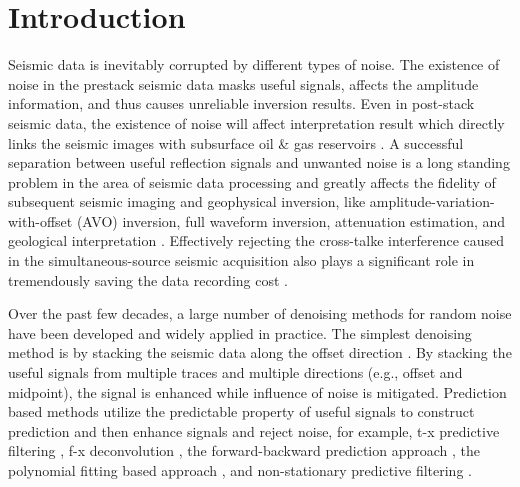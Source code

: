 \section{Introduction}
Seismic data is inevitably corrupted by different types of noise. The existence of noise in the prestack seismic data masks useful signals, affects the amplitude information, and thus causes unreliable inversion results. Even in post-stack seismic data, the existence of noise will affect interpretation result which directly links the seismic images with subsurface oil \& gas reservoirs \cite[]{yanfei2011,yangkangthesis,pstmjse2016,jsewe2016,yangkang2016emd,shuwei2016vscan}. A successful separation between useful reflection signals and unwanted noise is a long standing problem in the area of seismic data processing and greatly affects the fidelity of subsequent seismic imaging and geophysical inversion, like amplitude-variation-with-offset (AVO) inversion, full waveform inversion, attenuation estimation, and geological interpretation \cite[]{jsehessian2015,jserugekutta2016,jsepssp2016,jsedecon2016,fangyu2016,qianping2016,mostafa2016geo,mostafa2016jag,mostafa2016bssa,zhaoyu2016,qushan2016seg,jingnan2017,qushan2017,saleh2017,mostafa2017geo}. Effectively rejecting the cross-talke interference caused in the simultaneous-source seismic acquisition also plays a significant role in tremendously saving the data recording cost \cite[]{berkhout2008,qushan2014,abma2015,qushan2015,shaohuan2015,yangkang2015pnmo,yangkang2015image,yangkang2015dbortho,qushan2016,yangkang2017lsrtm,shaohuan2017,shaohuan2017jag,shaohuan2017gji,yatong2017}.

Over the past few decades, a large number of denoising methods for random noise have been developed and widely applied in practice. The simplest denoising method is by stacking the seismic data along the offset direction \cite[]{Mayne62,guochang2009,wencheng2015stack}. By stacking the useful signals from multiple traces and multiple directions (e.g., offset and midpoint), the signal is enhanced while influence of noise is mitigated. Prediction based methods utilize the predictable property of useful signals to construct prediction  and then enhance signals and reject noise, for example, t-x predictive filtering \cite[]{abma1995}, f-x deconvolution \cite[]{canales1984,mostafa2012}, the forward-backward prediction approach \cite[]{yanghua1999}, the polynomial fitting based approach \cite[]{guochang20112}, and non-stationary predictive filtering \cite[]{guochang2012,guochang2013}.  

